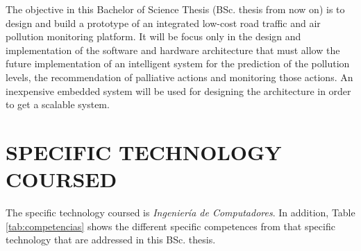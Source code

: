 \documentclass{pre-tfg}
\begin{document}
The objective in this Bachelor of Science Thesis (BSc. thesis from now on) is to design and build a prototype of an integrated low-cost road traffic and air pollution monitoring platform. It will be focus only in the design and implementation of the software and hardware architecture that must allow the future implementation of an intelligent system for the prediction of the pollution levels, the recommendation of palliative actions and monitoring those actions. An inexpensive embedded system will be used for designing the architecture in order to get a scalable system.



\section{SPECIFIC TECHNOLOGY COURSED}

The specific technology coursed is \emph{Ingeniería de Computadores}. In addition, Table \ref{tab:competencias} shows the different specific competences from that specific technology that are addressed in this BSc. thesis. 
\end{document}
